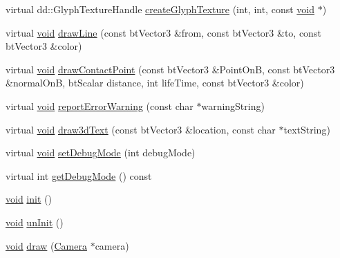 \begin{DoxyCompactItemize}
\item 
virtual dd\+::\+Glyph\+Texture\+Handle \mbox{\hyperlink{classnjli_1_1_world_debug_drawer_a33c8ba0bbcc08aefc27850aecbbfaeea}{create\+Glyph\+Texture}} (int, int, const \mbox{\hyperlink{_thread_8h_af1e856da2e658414cb2456cb6f7ebc66}{void}} $\ast$)
\item 
virtual \mbox{\hyperlink{_thread_8h_af1e856da2e658414cb2456cb6f7ebc66}{void}} \mbox{\hyperlink{classnjli_1_1_world_debug_drawer_a09b33cb0a07320fc6c10890abbf1e3b5}{draw\+Line}} (const bt\+Vector3 \&from, const bt\+Vector3 \&to, const bt\+Vector3 \&color)
\item 
virtual \mbox{\hyperlink{_thread_8h_af1e856da2e658414cb2456cb6f7ebc66}{void}} \mbox{\hyperlink{classnjli_1_1_world_debug_drawer_a5469fad4a1de098b62a2e9ecc3bcc291}{draw\+Contact\+Point}} (const bt\+Vector3 \&Point\+OnB, const bt\+Vector3 \&normal\+OnB, bt\+Scalar distance, int life\+Time, const bt\+Vector3 \&color)
\item 
virtual \mbox{\hyperlink{_thread_8h_af1e856da2e658414cb2456cb6f7ebc66}{void}} \mbox{\hyperlink{classnjli_1_1_world_debug_drawer_a283f65c1bc27f601271909a35ffac38d}{report\+Error\+Warning}} (const char $\ast$warning\+String)
\item 
virtual \mbox{\hyperlink{_thread_8h_af1e856da2e658414cb2456cb6f7ebc66}{void}} \mbox{\hyperlink{classnjli_1_1_world_debug_drawer_a76cbaf34350fd41f5fd929e97df5c9a3}{draw3d\+Text}} (const bt\+Vector3 \&location, const char $\ast$text\+String)
\item 
virtual \mbox{\hyperlink{_thread_8h_af1e856da2e658414cb2456cb6f7ebc66}{void}} \mbox{\hyperlink{classnjli_1_1_world_debug_drawer_a47497517ec5023b6ea53286eb6381510}{set\+Debug\+Mode}} (int debug\+Mode)
\item 
virtual int \mbox{\hyperlink{classnjli_1_1_world_debug_drawer_ace4ad17af606db8195712e15a42782b2}{get\+Debug\+Mode}} () const
\item 
\mbox{\hyperlink{_thread_8h_af1e856da2e658414cb2456cb6f7ebc66}{void}} \mbox{\hyperlink{classnjli_1_1_world_debug_drawer_aac2655edc06413745b2ff3ff13572a2d}{init}} ()
\item 
\mbox{\hyperlink{_thread_8h_af1e856da2e658414cb2456cb6f7ebc66}{void}} \mbox{\hyperlink{classnjli_1_1_world_debug_drawer_af34071bc860e89b151d779ee1c6acbbf}{un\+Init}} ()
\item 
\mbox{\hyperlink{_thread_8h_af1e856da2e658414cb2456cb6f7ebc66}{void}} \mbox{\hyperlink{classnjli_1_1_world_debug_drawer_a52ac5a94b12639e5450f77690ab8f5bc}{draw}} (\mbox{\hyperlink{classnjli_1_1_camera}{Camera}} $\ast$camera)

\end{DoxyCompactItemize}
